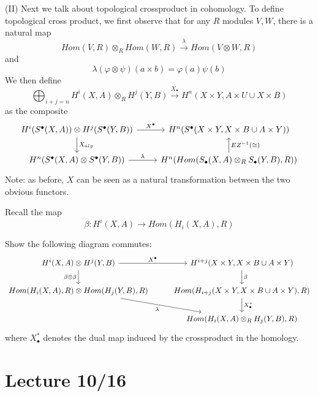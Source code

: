 (II) Next we talk about topological crossproduct in cohomology. To define topological cross product, we first observe that for any $R$ modules $V,W$, there is a natural map 
\begin{equation*}
    Hom(V,R)\otimes_R Hom(W,R)\xrightarrow{\lambda} Hom(V\otimes W,R)
\end{equation*}
and 
\begin{equation*}
    \lambda(\varphi\otimes\psi)(a\times b)=\varphi(a)\psi(b)
\end{equation*}
We then define 
\begin{equation*}
    \bigoplus_{i+j=n}H^i(X,A)\otimes_R H^j(Y,B)\xrightarrow{X_\bullet}H^n(X\times Y, A\times U\cup X\times B)
\end{equation*}
as the composite
\[\begin{tikzcd}
	{H^i(S^\bullet(X,A))\otimes H^j(S^\bullet(Y,B))} & {H^n(S^\bullet(X\times Y, X\times B\cup A\times Y))} \\
	{H^n(S^\bullet(X,A)\otimes S^\bullet(Y,B))} & {H^n(Hom(S_\bullet(X,A)\otimes_R S_\bullet(Y,B),R))}
	\arrow["{X^\bullet}", from=1-1, to=1-2]
	\arrow["{X_{alg}}", from=1-1, to=2-1]
	\arrow["\lambda", from=2-1, to=2-2]
	\arrow["{EZ^{-1} (\cong)}"', from=2-2, to=1-2]
\end{tikzcd}\]
Note: as before, $X$ can be seen as a natural transformation between the two obvious functors.

Recall the map 
\begin{equation*}
    \beta: H^i(X,A)\to Hom(H_i(X,A),R)
\end{equation*}
\begin{prob}[HW(3.6)]
    Show the following diagram commutes:
    \[\begin{tikzcd}
        {H^i(X,A)\otimes H^j(Y,B)} & {H^{i+j}(X\times Y, X\times B\cup A\times Y)} \\
        {Hom(H_i(X,A),R)\otimes Hom(H_j(Y,B),R)} & {Hom(H_{i+j}(X\times Y, X\times B\cup A\times Y),R)} \\
        & {Hom(H_i(X,A)\otimes_R H_j(Y,B),R)}
        \arrow["{X^\bullet}", from=1-1, to=1-2]
        \arrow["{\beta\otimes\beta}"', from=1-1, to=2-1]
        \arrow["\beta", from=1-2, to=2-2]
        \arrow["\lambda"', from=2-1, to=3-2]
        \arrow["{X_\bullet^*}", from=2-2, to=3-2]
    \end{tikzcd}\]
    where $X_\bullet^*$ denotes the dual map induced by the crossproduct in the homology.
\end{prob}


\section{Lecture 10/16}



